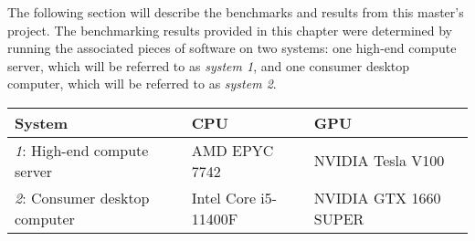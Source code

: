The following section will describe the benchmarks and results from this master's project.
The benchmarking results provided in this chapter were determined by running the associated pieces of software on two systems: one high-end compute server, which will be referred to as \textit{system 1}, and one consumer desktop computer, which will be referred to as \textit{system 2}.

\begin{center}
  \begin{tabular}{lll}
    \hline
      System                       & CPU                  & GPU                    \\
    \hline
      \textit{1}: High-end compute server   & AMD EPYC 7742        & NVIDIA Tesla V100      \\
      \textit{2}: Consumer desktop computer   & Intel Core i5-11400F & NVIDIA GTX 1660 SUPER  \\
    \hline
  \end{tabular}
\end{center}

